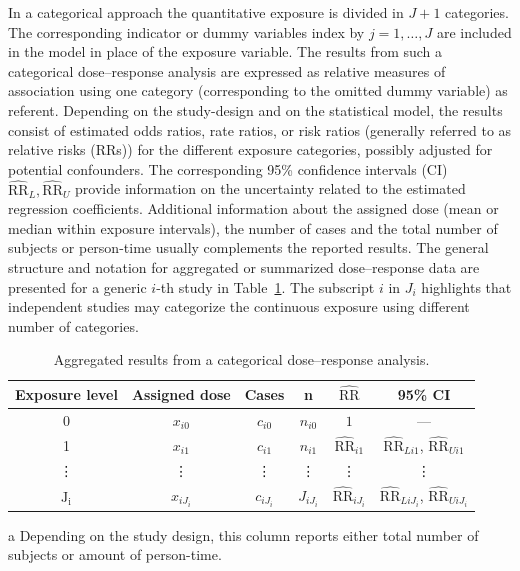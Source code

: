\documentclass[11pt,a4paper,twoside,openany]{book}\usepackage{knitr}
\begin{document}
{{In a categorical approach the quantitative exposure is divided in $J+1$ categories. The corresponding indicator or dummy variables index by $j = 1, \dots, J$ are included in the model in place of the exposure variable. The results from such a categorical dose--response analysis are expressed as relative measures of association using one category (corresponding to the omitted dummy variable) as referent. Depending on the study-design and on the statistical model, the results consist of estimated odds ratios, rate ratios, or risk ratios (generally referred to as relative risks (RRs)) for the different exposure categories, possibly adjusted for potential confounders. The corresponding 95\% confidence intervals (CI) $\widehat{\mathrm{RR}}_L, \widehat{\mathrm{RR}}_U$ provide information on the uncertainty related to the estimated regression coefficients. Additional information about the assigned dose (mean or median within exposure intervals), the number of cases and the total number of subjects or person-time usually complements the reported results. The general structure and notation for aggregated or summarized dose--response data are presented for a generic $i$-th study in Table~\ref{tab:aggr_data}. The subscript $i$ in $J_i$ highlights that independent studies may categorize the continuous exposure using different number of categories.

\begin{table}
  \centering
  \begin{threeparttable}
    \caption{Aggregated results from a categorical dose--response analysis.}
    \renewcommand{\arraystretch}{1.5}
    \begin{tabular}{cccccc}
      \hline
      Exposure level & Assigned dose & Cases & n\tnote{a} & $\widehat{\mathrm{RR}}$ & 95\% CI \\
      \hline
      0 & $x_{i0}$ & $c_{i0}$ & $n_{i0}$ & $1$ & --- \\
      1 & $x_{i1}$ & $c_{i1}$ & $n_{i1}$ & $\widehat{\mathrm{RR}}_{i1}$ & $\widehat{{\mathrm{RR}}}_{Li1}$, $\widehat{{\mathrm{RR}}}_{Ui1}$ \\
      \vdots & \vdots & \vdots & \vdots & \vdots & \vdots \\
      $\mathrm{J_i}$ & $x_{iJ_i}$ & $c_{iJ_i}$ & $J_{iJ_i}$ & $\widehat{\mathrm{RR}}_{iJ_i}$ & $\widehat{{\mathrm{RR}}}_{LiJ_i}$, $\widehat{{\mathrm{RR}}}_{UiJ_i}$ \\
      \hline
    \end{tabular}
    \begin{tablenotes}
      \item [a] \footnotesize Depending on the study design, this column reports either total number of subjects or amount of person-time.
    \end{tablenotes}
    \label{tab:aggr_data}
\end{threeparttable}
\end{table}

}}
\end{document}
